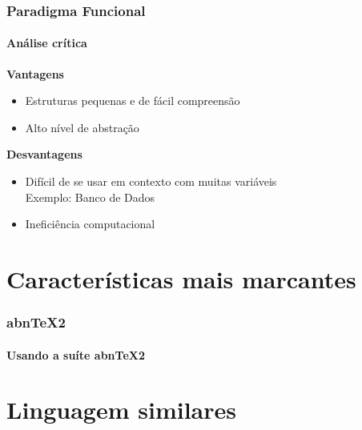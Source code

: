 \documentclass[aspectratio=169]{beamer}
\begin{document}
    \begin{frame}
      \frametitle{Paradigma Funcional}
      \framesubtitle{Análise crítica}

      \pause

      \textbf{Vantagens} 
      \begin{itemize}
        \item Estruturas pequenas e de fácil compreensão \pause 
        \item Alto nível de abstração \pause 
      \end{itemize}

      \textbf{Desvantagens} 
      \begin{itemize}
        \item Difícil de se usar em contexto com muitas variáveis
        \\ Exemplo: Banco de Dados \pause  
        \item Ineficiência computacional 
      \end{itemize}
       
    \end{frame}


    \nocite{haskellslides}
    \nocite{funcoespura}
    \nocite{funcoespura2}
    \nocite{haskellwikipedia}
    \nocite{paradigmas}



    \section{Características mais marcantes}

    \begin{frame}
      \frametitle{abnTeX2}
      \framesubtitle{Usando a suíte abnTeX2}
    \end{frame}


    \section{Linguagem similares}
\end{document}
